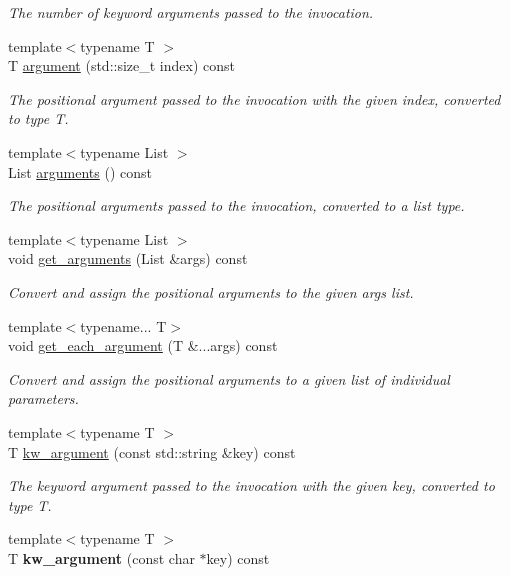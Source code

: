 \begin{DoxyCompactItemize}
\begin{DoxyCompactList}\small\item\em The number of keyword arguments passed to the invocation. \end{DoxyCompactList}\item 
{\footnotesize template$<$typename T $>$ }\\T \hyperlink{classautobahn_1_1wamp__invocation__impl_a50b2c6bf7297643434d118ec7cbad920}{argument} (std\+::size\+\_\+t index) const 
\begin{DoxyCompactList}\small\item\em The positional argument passed to the invocation with the given {\ttfamily index}, converted to type T. \end{DoxyCompactList}\item 
{\footnotesize template$<$typename List $>$ }\\List \hyperlink{classautobahn_1_1wamp__invocation__impl_aa310c722287e63499c6d30cc8e308cba}{arguments} () const 
\begin{DoxyCompactList}\small\item\em The positional arguments passed to the invocation, converted to a list type. \end{DoxyCompactList}\item 
{\footnotesize template$<$typename List $>$ }\\void \hyperlink{classautobahn_1_1wamp__invocation__impl_a36a95a4db85f7afe53998d2964315512}{get\+\_\+arguments} (List \&args) const 
\begin{DoxyCompactList}\small\item\em Convert and assign the positional arguments to the given {\ttfamily args} list. \end{DoxyCompactList}\item 
{\footnotesize template$<$typename... T$>$ }\\void \hyperlink{classautobahn_1_1wamp__invocation__impl_aaa65786d23eb2921fc132cbd9bac070f}{get\+\_\+each\+\_\+argument} (T \&...args) const 
\begin{DoxyCompactList}\small\item\em Convert and assign the positional arguments to a given list of individual parameters. \end{DoxyCompactList}\item 
{\footnotesize template$<$typename T $>$ }\\T \hyperlink{classautobahn_1_1wamp__invocation__impl_afcd0a85c37555a866d1cce41642221c5}{kw\+\_\+argument} (const std\+::string \&key) const 
\begin{DoxyCompactList}\small\item\em The keyword argument passed to the invocation with the given {\ttfamily key}, converted to type T. \end{DoxyCompactList}\item 
{\footnotesize template$<$typename T $>$ }\\T {\bfseries kw\+\_\+argument} (const char $\ast$key) const \hypertarget{classautobahn_1_1wamp__invocation__impl_a05dc5a66ed5265ff9fc323c82245bb5e}{}\label{classautobahn_1_1wamp__invocation__impl_a05dc5a66ed5265ff9fc323c82245bb5e}


\end{DoxyCompactItemize}
